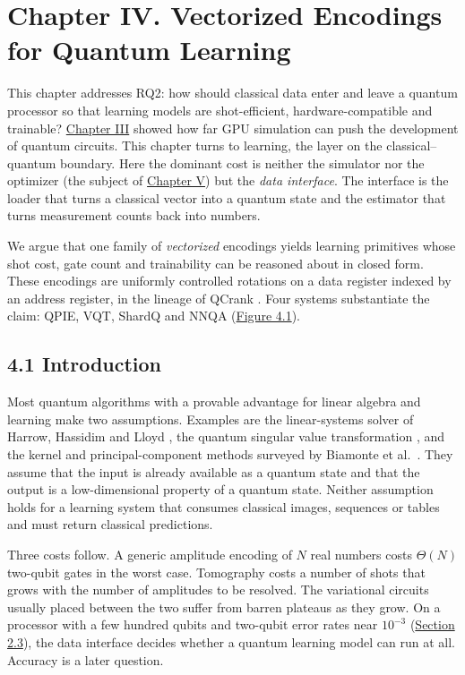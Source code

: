 \documentclass{report}
\theoremstyle{plain}
\theoremstyle{definition}
\theoremstyle{remark}
\begin{document}
\chapter{Chapter IV. Vectorized Encodings for Quantum Learning}\label{ch:qml}

This chapter addresses RQ2: how should classical data enter and leave a quantum processor so that learning models are shot-efficient, hardware-compatible and trainable? \hyperref[ch:qgear]{Chapter III} showed how far GPU simulation can push the development of quantum circuits. This chapter turns to learning, the layer on the classical--quantum boundary. Here the dominant cost is neither the simulator nor the optimizer (the subject of \hyperref[ch:nisq]{Chapter V}) but the \emph{data interface}. The interface is the loader that turns a classical vector into a quantum state and the estimator that turns measurement counts back into numbers.

We argue that one family of \emph{vectorized} encodings yields learning primitives whose shot cost, gate count and trainability can be reasoned about in closed form. These encodings are uniformly controlled rotations on a data register indexed by an address register, in the lineage of QCrank \cite{balewski2024qcrank}. Four systems substantiate the claim: QPIE, VQT, ShardQ and NNQA (\hyperref[fig:qml:overview]{Figure 4.1}).

\section{4.1 Introduction}\label{sec:qml:intro}

Most quantum algorithms with a provable advantage for linear algebra and learning make two assumptions. Examples are the linear-systems solver of Harrow, Hassidim and Lloyd \cite{harrow2009hhl}, the quantum singular value transformation \cite{gilyen2019qsvt}, and the kernel and principal-component methods surveyed by Biamonte et al.~\cite{biamonte2017qml}. They assume that the input is already available as a quantum state and that the output is a low-dimensional property of a quantum state. Neither assumption holds for a learning system that consumes classical images, sequences or tables and must return classical predictions.

Three costs follow. A generic amplitude encoding of $N$ real numbers costs $\Theta(N)$ two-qubit gates in the worst case. Tomography costs a number of shots that grows with the number of amplitudes to be resolved. The variational circuits usually placed between the two suffer from barren plateaus \cite{mcclean2018barren} as they grow. On a processor with a few hundred qubits and two-qubit error rates near $10^{-3}$ (\hyperref[sec:bg:nisq]{Section 2.3}), the data interface decides whether a quantum learning model can run at all. Accuracy is a later question.
\end{document}
